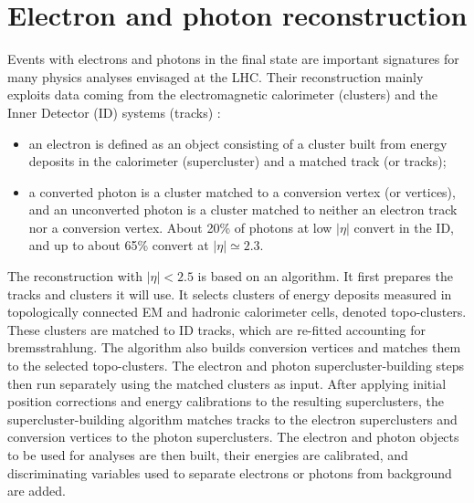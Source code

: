 \documentclass[a4paper, oneside]{book}
\begin{document}
	\chapter{Electron and photon reconstruction}
		Events with electrons and photons in the final state are important signatures for many physics analyses envisaged at the LHC. Their reconstruction mainly  exploits data coming from the electromagnetic calorimeter (clusters) and the Inner Detector (ID) systems (tracks) \cite{El ph intro}\cite{El ph reco}: 
		\begin{itemize}
			\item an electron is defined as an object consisting of a cluster built from energy deposits in the
			calorimeter (supercluster) and a matched track (or tracks);
			\item a  converted photon is a cluster matched to a conversion vertex (or vertices), and an unconverted photon is a cluster matched to neither an
			electron track nor a conversion vertex. About 20\% of photons at low $|\eta|$ convert in the ID, and up to about 65\% convert at $|\eta| \simeq 2.3$.
		\end{itemize}
		The reconstruction  with $|\eta| < 2.5$ is based on an algorithm. It first prepares the tracks and clusters it will use. It selects clusters of energy deposits measured in topologically connected EM and hadronic calorimeter cells, denoted topo-clusters. These clusters are matched to ID tracks, which are re-fitted accounting for bremsstrahlung. The algorithm also builds conversion vertices and matches them to the selected topo-clusters. The electron and photon supercluster-building steps then run separately using the matched clusters as input. After applying initial position corrections and energy
		calibrations to the resulting superclusters, the supercluster-building algorithm matches tracks to the electron superclusters and conversion vertices to the photon superclusters. The electron and photon
		objects to be used for analyses are then built, their energies are calibrated, and discriminating
		variables used to separate electrons or photons from background are added.
		
\end{document}
